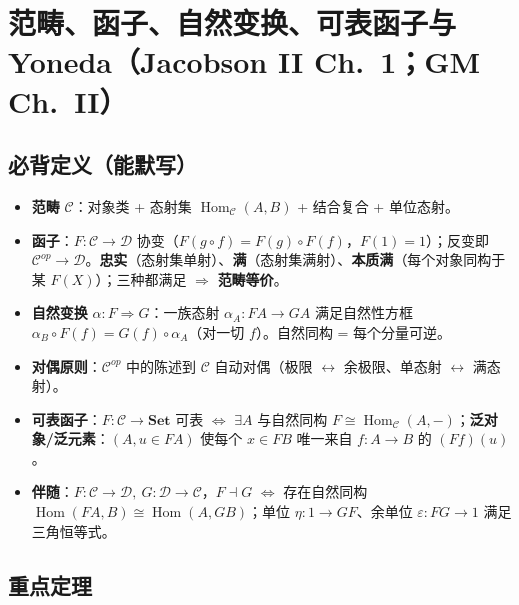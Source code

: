 \documentclass[12pt,a4paper]{ctexart}
\DeclareMathOperator{\Hom}{Hom}
\newcommand{\keypoint}{\text{\textbf{\ensuremath{\bigstar}}\;}}
\begin{document}
\section{范畴、函子、自然变换、可表函子与 Yoneda（Jacobson II Ch.~1；GM Ch.~II）}

\subsection{必背定义（能默写）}

\begin{itemize}
  \item \textbf{范畴} $\mathcal{C}$：对象类 + 态射集 $\Hom_{\mathcal C}(A,B)$ + 结合复合 + 单位态射。
  \item \textbf{函子}：$F\colon\mathcal C\to\mathcal D$ 协变（$F(g\circ f)=F(g)\circ F(f)$，$F(1)=1$）；反变即 $\mathcal C^{op}\to\mathcal D$。\textbf{忠实}（态射集单射）、\textbf{满}（态射集满射）、\textbf{本质满}（每个对象同构于某 $F(X)$）；三种都满足 $\Rightarrow$ \textbf{范畴等价}。
  \item \textbf{自然变换} $\alpha\colon F\Rightarrow G$：一族态射 $\alpha_A\colon FA\to GA$ 满足自然性方框 $\alpha_B\circ F(f)=G(f)\circ\alpha_A$（对一切 $f$）。自然同构 = 每个分量可逆。
  \item \textbf{对偶原则}：$\mathcal C^{op}$ 中的陈述到 $\mathcal C$ 自动对偶（极限 $\leftrightarrow$ 余极限、单态射 $\leftrightarrow$ 满态射）。
  \item \textbf{可表函子}：$F\colon\mathcal C\to\mathbf{Set}$ 可表 $\iff$ $\exists A$ 与自然同构 $F\cong\Hom_{\mathcal C}(A,-)$；\textbf{泛对象/泛元素}：$(A,u\in FA)$ 使每个 $x\in FB$ 唯一来自 $f\colon A\to B$ 的 $(Ff)(u)$。
  \item \textbf{伴随}：$F\colon\mathcal C\to\mathcal D,\ G\colon\mathcal D\to\mathcal C$，$F\dashv G$ $\iff$ 存在自然同构 $\Hom(FA,B)\cong\Hom(A,GB)$；单位 $\eta\colon1\to GF$、余单位 $\varepsilon\colon FG\to1$ 满足三角恒等式。
\end{itemize}

\subsection{\keypoint 重点定理}
\end{document}
